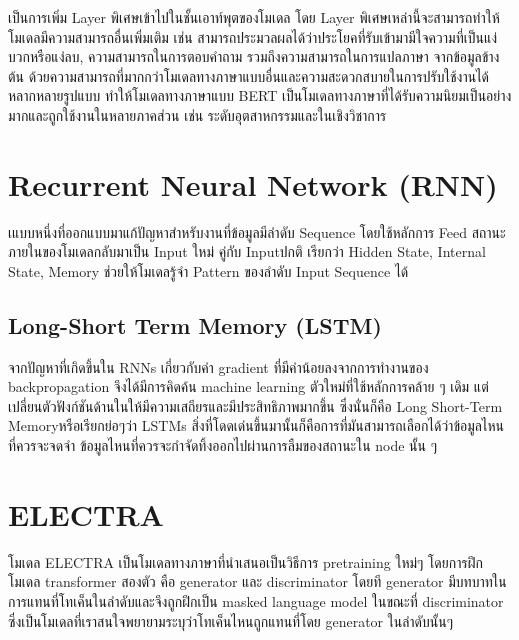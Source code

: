 \enskip \enskip \enskip เป็นการเพิ่ม Layer พิเศษเข้าไปในชั้นเอาท์พุตของโมเดล 
โดย Layer พิเศษเหล่านี้จะสามารถทำให้โมเดลมีความสามารถอื่นเพิ่มเติม 
เช่น สามารถประมวลผลได้ว่าประโยคที่รับเข้ามามีใจความที่เป็นแง่บวกหรือแง่ลบ,
ความสามารถในการตอบคำถาม รวมถึงความสามารถในการแปลภาษา
จากข้อมูลข้างต้น ด้วยความสามารถที่มากกว่าโมเดลทางภาษาแบบอื่นและความสะดวกสบายในการปรับใช้งานได้หลากหลายรูปแบบ 
ทำให้โมเดลทางภาษาแบบ BERT เป็นโมเดลทางภาษาที่ได้รับความนิยมเป็นอย่างมากและถูกใช้งานในหลายภาคส่วน 
เช่น ระดับอุตสาหกรรมและในเชิงวิชาการ



\section{Recurrent Neural Network (RNN)}
\enskip \enskip \enskip เแบบหนึ่งที่ออกแบบมาแก้ปัญหาสำหรับงานที่ข้อมูลมีลำดับ
Sequence โดยใช้หลักการ Feed สถานะภายในของโมเดลกลับมาเป็น Input ใหม่ คู่กับ Inputปกติ เรียกว่า
Hidden State, Internal State, Memory ช่วยให้โมเดลรู้จำ Pattern ของลำดับ
Input Sequence ได้

\subsection{Long-Short Term Memory (LSTM)}

\enskip \enskip \enskip จากปัญหาที่เกิดขึ้นใน RNNs เกี่ยวกับค่า gradient ที่มีค่าน้อยลงจากการทำงานของ backpropagation
จึงได้มีการคิดค้น machine learning ตัวใหม่ที่ใช้หลักการคล้าย ๆ เดิม แต่เปลี่ยนตัวฟังก์ชันด้านในให้มีความเสถียรและมีประสิทธิภาพมากขึ้น 
ซึ่งนั่นก็คือ Long Short-Term Memoryหรือเรียกย่อๆว่า LSTMs สิ่งที่โดดเด่นขึ้นมานั้นก็คือการที่มันสามารถเลือกได้ว่าข้อมูลไหนที่ควรจะจดจำ
ข้อมูลไหนที่ควรจะกำจัดทิ้งออกไปผ่านการลืมของสถานะใน node นั้น ๆ

\section{ELECTRA}

\enskip \enskip \enskip โมเดล ELECTRA เป็นโมเดลทางภาษาที่นำเสนอเป็นวิธีการ pretraining ใหม่ๆ โดยการฝึกโมเดล transformer สองตัว คือ generator และ discriminator 
โดยที generator มีบทบาทในการแทนที่โทเค็นในลำดับและจึงถูกฝึกเป็น masked language model ในขณะที่ discriminator 
ซึ่งเป็นโมเดลที่เราสนใจพยายามระบุว่าโทเค็นไหนถูกแทนที่โดย generator ในลำดับนั้นๆ

